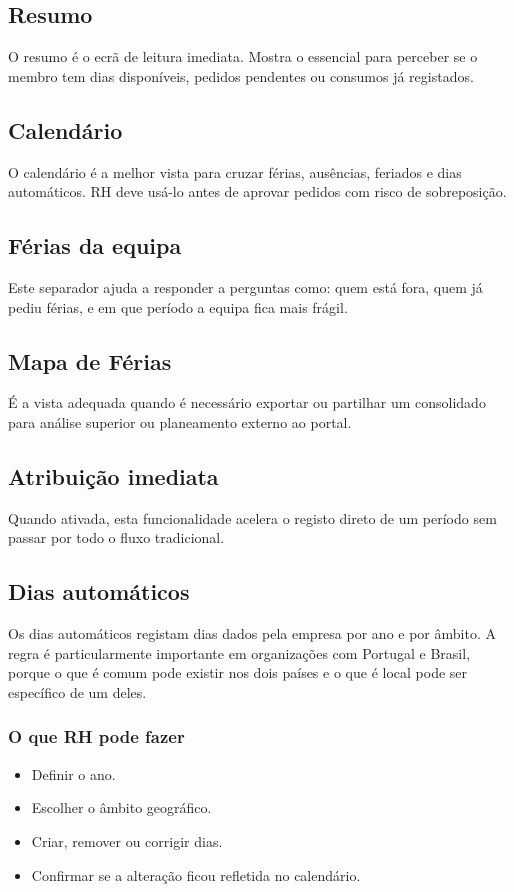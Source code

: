 \subsection{Resumo}
O resumo é o ecrã de leitura imediata. Mostra o essencial para perceber se o membro tem dias disponíveis, pedidos pendentes ou consumos já registados.

\subsection{Calendário}
O calendário é a melhor vista para cruzar férias, ausências, feriados e dias automáticos. RH deve usá-lo antes de aprovar pedidos com risco de sobreposição.

\subsection{Férias da equipa}
Este separador ajuda a responder a perguntas como: quem está fora, quem já pediu férias, e em que período a equipa fica mais frágil.

\subsection{Mapa de Férias}
É a vista adequada quando é necessário exportar ou partilhar um consolidado para análise superior ou planeamento externo ao portal.

\subsection{Atribuição imediata}
Quando ativada, esta funcionalidade acelera o registo direto de um período sem passar por todo o fluxo tradicional.

\subsection{Dias automáticos}
Os dias automáticos registam dias dados pela empresa por ano e por âmbito. A regra é particularmente importante em organizações com Portugal e Brasil, porque o que é comum pode existir nos dois países e o que é local pode ser específico de um deles.

\subsubsection{O que RH pode fazer}
\begin{itemize}
  \item Definir o ano.
  \item Escolher o âmbito geográfico.
  \item Criar, remover ou corrigir dias.
  \item Confirmar se a alteração ficou refletida no calendário.
\end{itemize}

